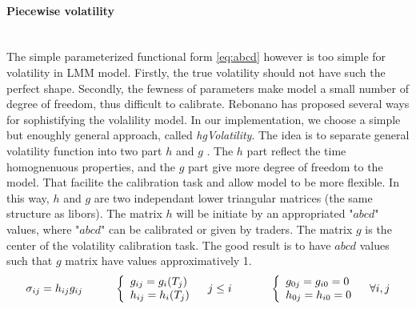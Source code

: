\documentclass[a4paper,10pt]{article}
\begin{document}
\paragraph{Piecewise volatility}\mbox{} \\
The simple parameterized functional form \ref{eq:abcd} however is too simple for volatility in LMM model. Firstly, the true volatility should not have such the perfect shape. Secondly, the fewness of parameters make model a small number of degree of freedom, thus difficult to calibrate. Rebonano has proposed several ways for sophistifying the volalility model. In our implementation, we choose a simple but enoughly general approach, called \textit{hgVolatility}. The idea is to separate general  volatility function into two part $h$ and $g$ . The $h$ part reflect the time homognenuous properties, and the $g$ part give  more degree of freedom to the model. That facilite the calibration task and allow model to be more flexible. In this way, $h$ and $g$ are two independant lower triangular matrices (the same structure as libors). The matrix $h$ will be initiate by an appropriated "$abcd$" values, where "$abcd$" can be calibrated or given by traders. The matrix $g$ is the center of the volatility calibration task. The good result is to have $abcd$ values such that $g$ matrix have values approximatively 1.
\[
\sigma_{ij} = h_{ij}g_{ij}
\hspace{1cm}
\left\{
\begin{array}{l}
g_{ij}= g_i(T_j) \\
h_{ij}= h_i(T_j)
\end{array}
\right.
\hspace{0.3cm}
j \leq i
\hspace{1.2cm}
\left\{
\begin{array}{l}
g_{0j}=g_{i0}=0 \\
h_{0j}=h_{i0}=0
\end{array}
\right.
\hspace{0.3cm}
\forall i,j
\]
\end{document}
